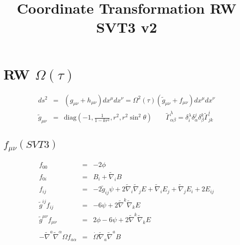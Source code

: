 \documentclass[10pt,letterpaper]{article}
\title{Coordinate Transformation RW SVT3 v2}
\date{}
\numberwithin{equation}{section}
\begin{document}
 
\maketitle
\noindent 
\section{RW $\Omega(\tau)$}
\begin{eqnarray}
ds^2 &=& (g_{\mu\nu} + h_{\mu\nu})dx^\mu dx^\nu = \Omega^2(\tau)(\tilde g_{\mu\nu} + f_{\mu\nu})dx^\mu dx^\nu
\\
\tilde g_{\mu\nu} &=& \text{diag}\left(-1,\frac{1}{1-kr^2},r^2,r^2\sin^2\theta\right)\qquad \tilde \Gamma^{\lambda}_{\alpha\beta} = \delta^\lambda_i \delta^j_\alpha \delta^k_\beta \tilde \Gamma^{i}_{jk}
\end{eqnarray}
%
\subsection{$f_{\mu\nu}(SVT3)$}
\begin{eqnarray}
f_{00} &=& -2\phi
\nonumber\\
f_{0i} &=& B_i + \tilde\nabla_i B
\nonumber\\
f_{ij} &=& -2\tilde g_{ij} \psi + 2\tilde\nabla_i\tilde\nabla_j E + \tilde\nabla_i E_j + \tilde\nabla_j E_i + 2E_{ij}
\nonumber\\
\tilde g^{ij} f_{ij} &=& -6\psi + 2\tilde\nabla^k\tilde\nabla_k E
\nonumber\\
\tilde g^{\mu\nu} f_{\mu\nu} &=& 2\phi-6\psi + 2\tilde\nabla^k\tilde\nabla_k E
\\ \nonumber\\
-\tilde\nabla^a \tilde\nabla^\alpha \Omega f_{a\alpha} &=& \dot\Omega \tilde\nabla_a\tilde\nabla^a B
\end{eqnarray}
%
\end{document}
